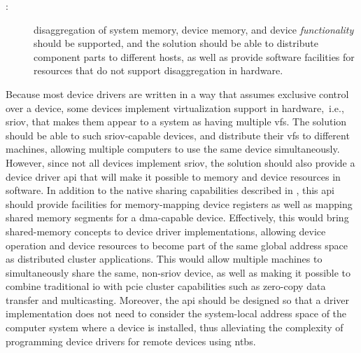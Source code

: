     
\begin{description}
    \item[:] \Gls{disaggregation} of system memory, device memory, and device \emph{functionality} should be supported, and the solution should be able to distribute component parts to different hosts, as well as provide software facilities for resources that do not support \gls{disaggregation} in hardware.
\end{description}
Because most device drivers are written in a way that assumes exclusive control over a device, some devices implement virtualization support in hardware,~i.e., \gls{sriov}, that makes them appear to a system as having multiple \glspl{vf}. 
%
The solution should be able to  such \gls{sriov}-capable devices, and distribute their \glspl{vf} to different machines, allowing multiple computers to use the same device simultaneously.
%
However, since not all devices implement \gls{sriov}, the solution should also provide a device driver \gls{api} that will make it possible to  memory and device resources in software.
%
In addition to the native sharing capabilities described in , this \gls{api} 
should provide facilities for memory-mapping device registers as well as mapping shared memory segments for a \gls{dma}-capable device.
%
Effectively, this would bring shared-memory concepts to device driver implementations, allowing device operation and device resources to become part of the same global address space as distributed cluster applications.
%
This would allow multiple machines to simultaneously share the same, non-\gls{sriov} device, as well as making it possible to combine traditional \gls{io} with \gls{pcie} cluster capabilities such as zero-copy data transfer and multicasting.
%
Moreover, the \gls{api} should be designed so that a driver implementation does not need to consider the system-local address space of the computer system where a device is installed, thus alleviating the complexity of programming device drivers for remote devices using \glspl{ntb}.

